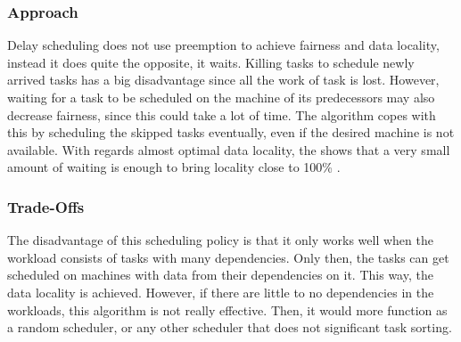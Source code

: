 \documentclass{article}
\begin{document}
\subsubsection{Approach}
Delay scheduling does not use preemption to achieve fairness and data locality, instead it does quite the opposite, it waits. Killing tasks to schedule newly arrived tasks has a big disadvantage since all the work of task is lost. However, waiting for a task to be scheduled on the machine of its predecessors may also decrease fairness, since this could take a lot of time. The algorithm copes with this by scheduling the skipped tasks eventually, even if the desired machine is not available. With regards almost optimal data locality, the shows that a very small amount of waiting is enough to bring locality close to 100{\%} \cite{zaharia2010delay}.

\subsubsection{Trade-Offs}
The disadvantage of this scheduling policy is that it only works well when the workload consists of tasks with many dependencies. Only then, the tasks can get scheduled on machines with data from their dependencies on it. This way, the data locality is achieved. However, if there are little to no dependencies in the workloads, this algorithm is not really effective. Then, it would more function as a random scheduler, or any other scheduler that does not significant task sorting. 
\end{document}
